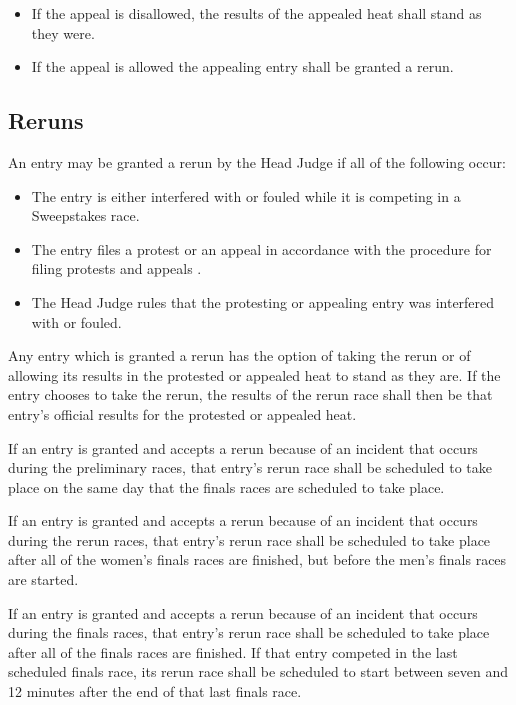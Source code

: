 	\begin{itemize}

		\item
		If the appeal is disallowed, the results of the appealed heat shall stand as
		they were.

		\item
		If the appeal is allowed the appealing entry shall be granted a rerun.

	\end{itemize}	

\subsection{Reruns}

	An entry may be granted a rerun by the Head Judge if all of the following
	occur:
		
	\begin{itemize}

		\item The entry is either interfered with or fouled while it is competing
		in a Sweepstakes race.

		\item The entry files a protest or an appeal in accordance with the
		procedure for filing protests and appeals .

		\item The Head Judge rules that the protesting or appealing entry was
		interfered with or fouled.

	\end{itemize}

	Any entry which is granted a rerun has the option of taking the rerun or of
	allowing its results in the protested or appealed heat to stand as they are. If
	the entry chooses to take the rerun, the results of the rerun race shall then
	be that entry's official results for the protested or appealed heat.

	If an entry is granted and accepts a rerun because of an incident that occurs
	during the preliminary races, that entry's rerun race shall be scheduled to
	take place on the same day that the finals races are scheduled to take place.

	If an entry is granted and accepts a rerun because of an incident that occurs
	during the rerun races, that entry's rerun race shall be scheduled to take
	place after all of the women's finals races are finished, but before the men's
	finals races are started.

	If an entry is granted and accepts a rerun because of an incident that occurs
	during the finals races, that entry's rerun race shall be scheduled to take
	place after all of the finals races are finished. If that entry competed in the
	last scheduled finals race, its rerun race shall be scheduled to start between
	seven and 12 minutes after the end of that last finals race.

